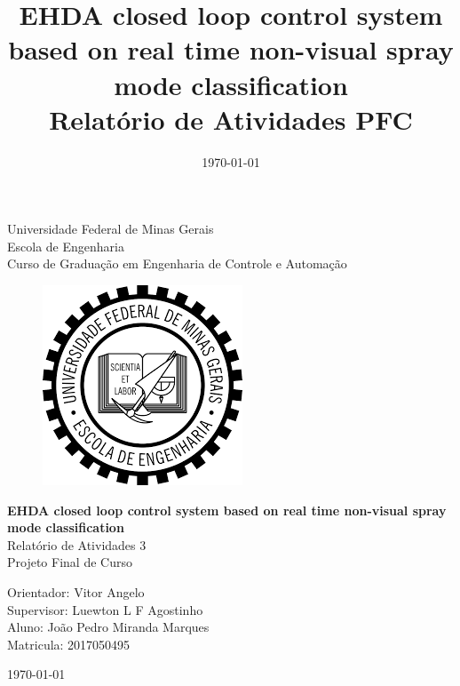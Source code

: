 \begin{titlepage}
    \begin{center}
           
    {\large Universidade Federal de Minas Gerais\\
    Escola de Engenharia \\
    Curso de Graduação em Engenharia de Controle e Automação\\}
    \vfill

    \begin{figure}[h]
        \centering
        \includegraphics[scale=0.5]{images/brasao_ufmg.png}
    \end{figure}
    \vspace{2cm}


    {\bf\Large EHDA closed loop control system based on real time non-visual spray mode classification\\}
    \vspace{1cm} 
    {\Large Relatório de Atividades 3   \\  Projeto Final de Curso}
    \vspace{2cm}  
    
    {\large Orientador: Vitor Angelo\\
            Supervisor: Luewton L F Agostinho}\\

    
    {\large Aluno: João Pedro Miranda Marques \\
    Matricula: 2017050495}
    \vspace{2cm}  

    \today
    \vspace{2cm}  
       

    \large \date{\today}
    \end{center}
    
    \end{titlepage}
    
    \newpage
    \clearpage
    \thispagestyle{empty}
    
    \cleardoublepage


\title{
    EHDA closed loop control system based on real time non-visual spray mode classification \\
    \large Relatório de Atividades PFC}

